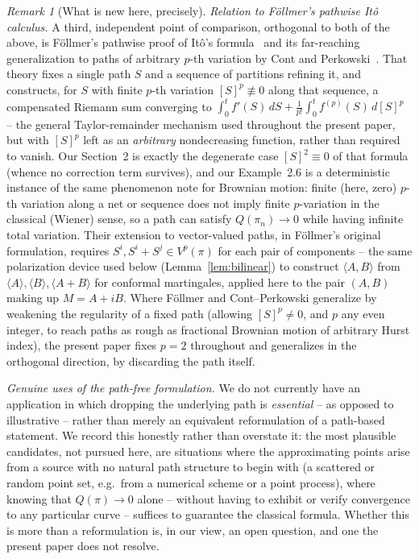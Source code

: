 \documentclass[11pt,fleqn]{article}
\theoremstyle{plain}
\theoremstyle{remark}
\newtheorem{remark}[thm]{Remark}
\begin{document}
\begin{remark}[What is new here, precisely]
\emph{Relation to F\"ollmer's pathwise It\^o calculus.} A third,
independent point of comparison, orthogonal to both of the above, is
F\"ollmer's pathwise proof of It\^o's formula~\cite{F} and its
far-reaching generalization to paths of arbitrary $p$-th variation by
Cont and Perkowski~\cite{ContPerkowski19}. That theory fixes a single
path $S$ and a sequence of partitions refining it, and constructs, for
$S$ with finite $p$-th variation $[S]^p\not\equiv0$ along that sequence,
a compensated Riemann sum converging to
$\int_0^tf'(S)\,dS+\frac1{p!}\int_0^tf^{(p)}(S)\,d[S]^p$ -- the general
Taylor-remainder mechanism used throughout the present paper, but with
$[S]^p$ left as an \emph{arbitrary} nondecreasing function, rather than
required to vanish. Our Section~2 is exactly the degenerate case
$[S]^2\equiv0$ of that formula (whence no correction term survives),
and our Example~2.6 is a deterministic instance of the same phenomenon
\cite[Remark~1.2]{ContPerkowski19} note for Brownian motion: finite
(here, zero) $p$-th variation along a net or sequence does not imply
finite $p$-variation in the classical (Wiener) sense, so a path can
satisfy $Q(\pi_n)\to0$ while having infinite total variation. Their
extension to vector-valued paths, in F\"ollmer's original formulation,
requires $S^i,S^i+S^j\in V^p(\pi)$ for each pair of components -- the
same polarization device used below (Lemma~\ref{lem:bilinear}) to
construct $\langle A,B\rangle$ from $\langle A\rangle,\langle
B\rangle,\langle A+B\rangle$ for conformal martingales, applied here to
the pair $(A,B)$ making up $M=A+iB$. Where F\"ollmer and Cont--Perkowski
generalize by weakening the regularity of a fixed path (allowing
$[S]^p\ne0$, and $p$ any even integer, to reach paths as rough as
fractional Brownian motion of arbitrary Hurst index), the present paper
fixes $p=2$ throughout and generalizes in the orthogonal direction, by
discarding the path itself.

\emph{Genuine uses of the path-free formulation.} We do not currently
have an application in which dropping the underlying path is
\emph{essential} -- as opposed to illustrative -- rather than merely an
equivalent reformulation of a path-based statement. We record this
honestly rather than overstate it: the most plausible candidates, not
pursued here, are situations where the approximating points arise from
a source with no natural path structure to begin with (a scattered or
random point set, e.g.\ from a numerical scheme or a point process),
where knowing that $Q(\pi)\to0$ alone -- without having to exhibit or
verify convergence to any particular curve -- suffices to guarantee the
classical formula. Whether this is more than a reformulation is, in our
view, an open question, and one the present paper does not resolve.
\end{remark}
\end{document}
